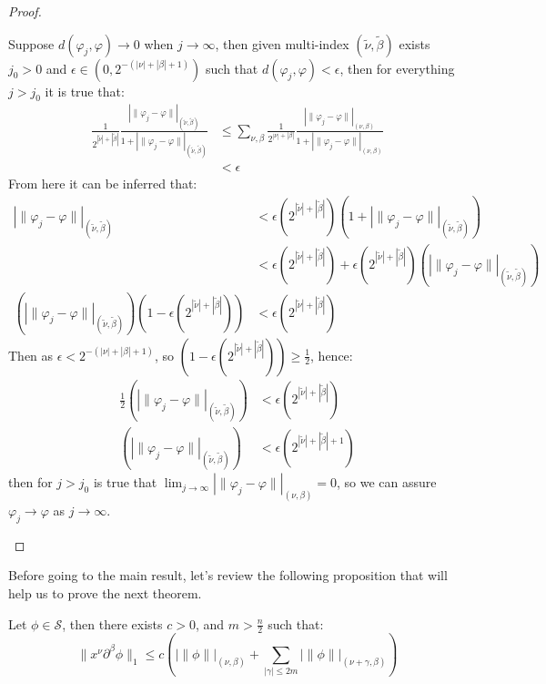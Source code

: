 \begin{proof}{}
\begin{enumerate}
\begin{itemize}
			    Suppose $d(\varphi_j,\varphi)\rightarrow 0$ when $j\rightarrow \infty$, then given multi-index $(\tilde{\nu},\tilde{\beta})$ exists $j_0> 0$ and $\epsilon\in(0,2^{-(|\nu|+|\beta|+1)})$ such that $d(\varphi_j,\varphi)<\epsilon$, then for everything $j>j_0$ it is true that:
			    \begin{align*}
            \frac{1}{2^{|\tilde{\nu}|+|\tilde{\beta}|}}\frac{|\|\varphi_j-\varphi\||_{(\tilde{\nu},\tilde{\beta})}}{1+|\|\varphi_j-\varphi\||_{(\tilde{\nu},\tilde{\beta})}}&\leq \sum_{\nu,\beta}\frac{1}{2^{|\nu|+|\beta|}}\frac{|\|\varphi_j-\varphi\||_{(\nu,\beta)}}{1+|\|\varphi_j-\varphi\||_{(\nu,\beta)}}\\
    				&< \epsilon
			    \end{align*}
			    From here it can be inferred that:
          \begin{align*}
            |\|\varphi_j-\varphi\||_{(\tilde{\nu},\tilde{\beta})}&< \epsilon (2^{|\tilde{\nu}|+|\tilde{\beta}|})(1+|\|\varphi_j-\varphi\||_{(\tilde{\nu},\tilde{\beta})})\\
            &< \epsilon (2^{|\tilde{\nu}|+|\tilde{\beta}|})+\epsilon(2^{|\tilde{\nu}|+|\tilde{\beta}|})(|\|\varphi_j-\varphi\||_{(\tilde{\nu},\tilde{\beta})})\\
            (|\|\varphi_j-\varphi\||_{(\tilde{\nu},\tilde{\beta})})(1-\epsilon(2^{|\tilde{\nu}|+|\tilde{\beta}|}))&< \epsilon(2^{|\tilde{\nu}|+|\tilde{\beta}|})
          \end{align*}
          Then as $\epsilon < 2^{-(|\nu|+|\beta|+1)}$, so $(1-\epsilon(2^{|\tilde{\nu}|+|\tilde{\beta}|}))\geq \frac{1}{2}$, hence:
          \begin{align*}
            \frac{1}{2}(|\|\varphi_j-\varphi\||_{(\tilde{\nu},\tilde{\beta})})&< \epsilon (2^{|\tilde{\nu}|+|\tilde{\beta}|})\\
            (|\|\varphi_j-\varphi\||_{(\tilde{\nu},\tilde{\beta})})&< \epsilon (2^{|\tilde{\nu}|+|\tilde{\beta}|+1})
          \end{align*}
          then for $j>j_0$ is true that $\lim_{j\rightarrow \infty}|\|\varphi_j-\varphi\||_{(\nu,\beta)}=0$, so we can assure $\varphi_j \rightarrow \varphi$ as $j\rightarrow \infty$.
		  \end{itemize}
	\end{enumerate}
\end{proof}
Before going to the main result, let's review the following proposition that will help us to prove the next theorem.
\begin{proposition}{}
	Let $\phi\in\mathcal{S}$, then there exists $c>0$, and $m>\frac{n}{2}$ such that:
	$$\|x^{\nu}\partial^{\beta}\phi\|_{1}\leq c(|\|\phi\||_{(\nu,\beta)}+\sum_{|\gamma|\leq 2m}|\|\phi\||_{(\nu+\gamma,\beta)})$$
\end{proposition}
